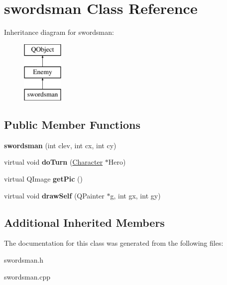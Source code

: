 \hypertarget{classswordsman}{\section{swordsman Class Reference}
\label{classswordsman}
}
Inheritance diagram for swordsman\-:\begin{figure}[H]
\begin{center}
\leavevmode
\includegraphics[height=3.000000cm]{classswordsman}
\end{center}
\end{figure}
\subsection*{Public Member Functions}
\begin{DoxyCompactItemize}
\item 
\hypertarget{classswordsman_afa4407146d49326932f9b1fa4f97ab2d}{{\bfseries swordsman} (int clev, int cx, int cy)}\label{classswordsman_afa4407146d49326932f9b1fa4f97ab2d}

\item 
\hypertarget{classswordsman_a99dec33c47dc5f3936229e5045b9c235}{virtual void {\bfseries do\-Turn} (\hyperlink{class_character}{Character} $\ast$Hero)}\label{classswordsman_a99dec33c47dc5f3936229e5045b9c235}

\item 
\hypertarget{classswordsman_a68098988c90a499ebfb757c7750bae7f}{virtual Q\-Image {\bfseries get\-Pic} ()}\label{classswordsman_a68098988c90a499ebfb757c7750bae7f}

\item 
\hypertarget{classswordsman_ad897e7c34033347faa5e4022b27cc395}{virtual void {\bfseries draw\-Self} (Q\-Painter $\ast$g, int gx, int gy)}\label{classswordsman_ad897e7c34033347faa5e4022b27cc395}

\end{DoxyCompactItemize}
\subsection*{Additional Inherited Members}


The documentation for this class was generated from the following files\-:\begin{DoxyCompactItemize}
\item 
swordsman.\-h\item 
swordsman.\-cpp\end{DoxyCompactItemize}
